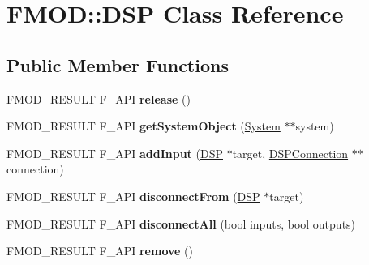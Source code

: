 \hypertarget{class_f_m_o_d_1_1_d_s_p}{}\section{F\+M\+OD\+:\+:D\+SP Class Reference}
\label{class_f_m_o_d_1_1_d_s_p}
\subsection*{Public Member Functions}
\begin{DoxyCompactItemize}
\item 
F\+M\+O\+D\+\_\+\+R\+E\+S\+U\+LT F\+\_\+\+A\+PI {\bfseries release} ()\hypertarget{class_f_m_o_d_1_1_d_s_p_a4ffd9dbcf1b0119a2ab94d27744ee033}{}\label{class_f_m_o_d_1_1_d_s_p_a4ffd9dbcf1b0119a2ab94d27744ee033}

\item 
F\+M\+O\+D\+\_\+\+R\+E\+S\+U\+LT F\+\_\+\+A\+PI {\bfseries get\+System\+Object} (\hyperlink{class_f_m_o_d_1_1_system}{System} $\ast$$\ast$system)\hypertarget{class_f_m_o_d_1_1_d_s_p_a06bef2d5b365de903e12fff814da31c7}{}\label{class_f_m_o_d_1_1_d_s_p_a06bef2d5b365de903e12fff814da31c7}

\item 
F\+M\+O\+D\+\_\+\+R\+E\+S\+U\+LT F\+\_\+\+A\+PI {\bfseries add\+Input} (\hyperlink{class_f_m_o_d_1_1_d_s_p}{D\+SP} $\ast$target, \hyperlink{class_f_m_o_d_1_1_d_s_p_connection}{D\+S\+P\+Connection} $\ast$$\ast$connection)\hypertarget{class_f_m_o_d_1_1_d_s_p_a647ccb2fdd73ecc1ce2c9a7a5411cb8c}{}\label{class_f_m_o_d_1_1_d_s_p_a647ccb2fdd73ecc1ce2c9a7a5411cb8c}

\item 
F\+M\+O\+D\+\_\+\+R\+E\+S\+U\+LT F\+\_\+\+A\+PI {\bfseries disconnect\+From} (\hyperlink{class_f_m_o_d_1_1_d_s_p}{D\+SP} $\ast$target)\hypertarget{class_f_m_o_d_1_1_d_s_p_a4a7dec17c9528099e23fe92102c10c38}{}\label{class_f_m_o_d_1_1_d_s_p_a4a7dec17c9528099e23fe92102c10c38}

\item 
F\+M\+O\+D\+\_\+\+R\+E\+S\+U\+LT F\+\_\+\+A\+PI {\bfseries disconnect\+All} (bool inputs, bool outputs)\hypertarget{class_f_m_o_d_1_1_d_s_p_a3eb9cfc992a069357bbebeafffad9c8e}{}\label{class_f_m_o_d_1_1_d_s_p_a3eb9cfc992a069357bbebeafffad9c8e}

\item 
F\+M\+O\+D\+\_\+\+R\+E\+S\+U\+LT F\+\_\+\+A\+PI {\bfseries remove} ()\hypertarget{class_f_m_o_d_1_1_d_s_p_ae7503115a44e52310e9a7cfe4063cd81}{}\label{class_f_m_o_d_1_1_d_s_p_ae7503115a44e52310e9a7cfe4063cd81}


\end{DoxyCompactItemize}
